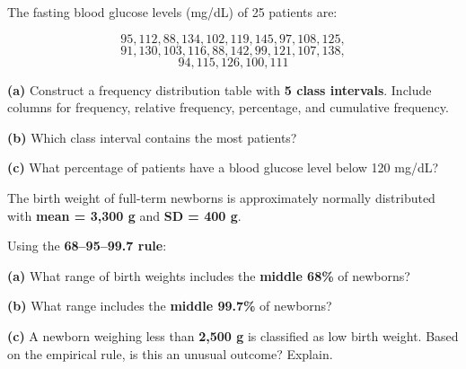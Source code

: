 \documentclass[
  12pt,
  letterpaper,
]{book}
\begin{document}
\begin{tcolorbox}[enhanced jigsaw, arc=.35mm, bottomrule=.15mm, bottomtitle=1mm, breakable, colback=white, colbacktitle=quarto-callout-caution-color!10!white, colframe=quarto-callout-caution-color-frame, coltitle=black, left=2mm, leftrule=.75mm, opacityback=0, opacitybacktitle=0.6, rightrule=.15mm, title={✏️ Exercise 1}, titlerule=0mm, toprule=.15mm, toptitle=1mm]

The fasting blood glucose levels (mg/dL) of 25 patients are:

\[95, 112, 88, 134, 102, 119, 145, 97, 108, 125,\]
\[91, 130, 103, 116, 88, 142, 99, 121, 107, 138,\]
\[94, 115, 126, 100, 111\]

\textbf{(a)} Construct a frequency distribution table with \textbf{5
class intervals}. Include columns for frequency, relative frequency,
percentage, and cumulative frequency.

\textbf{(b)} Which class interval contains the most patients?

\textbf{(c)} What percentage of patients have a blood glucose level
below 120 mg/dL?

\end{tcolorbox}

\begin{tcolorbox}[enhanced jigsaw, arc=.35mm, bottomrule=.15mm, bottomtitle=1mm, breakable, colback=white, colbacktitle=quarto-callout-caution-color!10!white, colframe=quarto-callout-caution-color-frame, coltitle=black, left=2mm, leftrule=.75mm, opacityback=0, opacitybacktitle=0.6, rightrule=.15mm, title={✏️ Exercise 2}, titlerule=0mm, toprule=.15mm, toptitle=1mm]

The birth weight of full-term newborns is approximately normally
distributed with \textbf{mean = 3,300 g} and \textbf{SD = 400 g}.

Using the \textbf{68--95--99.7 rule}:

\textbf{(a)} What range of birth weights includes the \textbf{middle
68\%} of newborns?

\textbf{(b)} What range includes the \textbf{middle 99.7\%} of newborns?

\textbf{(c)} A newborn weighing less than \textbf{2,500 g} is classified
as low birth weight. Based on the empirical rule, is this an unusual
outcome? Explain.

\end{tcolorbox}
\end{document}
